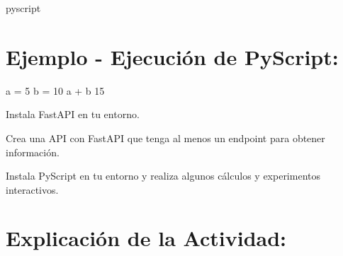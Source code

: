\documentclass[
  a4paper,
  DIV=11,
  numbers=noendperiod,
  onepage,
  openany]{scrreprt}
\newenvironment{Shaded}{\begin{snugshade}}{\end{snugshade}}
\newcommand{\DecValTok}[1]{\textcolor[rgb]{0.68,0.00,0.00}{#1}}
\newcommand{\ExtensionTok}[1]{\textcolor[rgb]{0.00,0.23,0.31}{#1}}
\newcommand{\NormalTok}[1]{\textcolor[rgb]{0.00,0.23,0.31}{#1}}
\newcommand{\OperatorTok}[1]{\textcolor[rgb]{0.37,0.37,0.37}{#1}}
\begin{document}
\begin{Shaded}
\begin{Highlighting}[]
\ExtensionTok{pyscript}
\end{Highlighting}
\end{Shaded}

\hypertarget{ejemplo---ejecuciuxf3n-de-pyscript-1}{%
\section{Ejemplo - Ejecución de
PyScript:}\label{ejemplo---ejecuciuxf3n-de-pyscript-1}}

\begin{Shaded}
\begin{Highlighting}[]
\NormalTok{a }\OperatorTok{=} \DecValTok{5}
\NormalTok{b }\OperatorTok{=} \DecValTok{10}
\NormalTok{a }\OperatorTok{+}\NormalTok{ b}
\DecValTok{15}
\end{Highlighting}
\end{Shaded}

\begin{tcolorbox}[enhanced jigsaw, colbacktitle=quarto-callout-important-color!10!white, toprule=.15mm, leftrule=.75mm, titlerule=0mm, opacityback=0, rightrule=.15mm, opacitybacktitle=0.6, breakable, left=2mm, coltitle=black, title=\textcolor{quarto-callout-important-color}{\faExclamation}\hspace{0.5em}{Actividad Práctica:}, toptitle=1mm, bottomtitle=1mm, arc=.35mm, bottomrule=.15mm, colback=white, colframe=quarto-callout-important-color-frame]

Instala FastAPI en tu entorno.

Crea una API con FastAPI que tenga al menos un endpoint para obtener
información.

Instala PyScript en tu entorno y realiza algunos cálculos y experimentos
interactivos.

\end{tcolorbox}

\hypertarget{explicaciuxf3n-de-la-actividad-83}{%
\section{Explicación de la
Actividad:}\label{explicaciuxf3n-de-la-actividad-83}}
\end{document}
